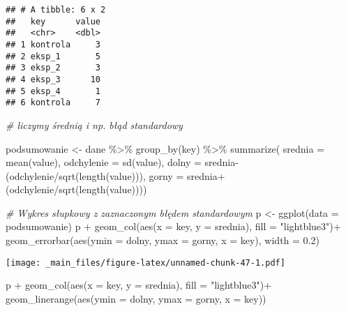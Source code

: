 \documentclass[
]{book}
\newenvironment{Shaded}{\begin{snugshade}}{\end{snugshade}}
\newcommand{\AttributeTok}[1]{\textcolor[rgb]{0.77,0.63,0.00}{#1}}
\newcommand{\CommentTok}[1]{\textcolor[rgb]{0.56,0.35,0.01}{\textit{#1}}}
\newcommand{\FloatTok}[1]{\textcolor[rgb]{0.00,0.00,0.81}{#1}}
\newcommand{\FunctionTok}[1]{\textcolor[rgb]{0.00,0.00,0.00}{#1}}
\newcommand{\NormalTok}[1]{#1}
\newcommand{\OtherTok}[1]{\textcolor[rgb]{0.56,0.35,0.01}{#1}}
\newcommand{\SpecialCharTok}[1]{\textcolor[rgb]{0.00,0.00,0.00}{#1}}
\newcommand{\StringTok}[1]{\textcolor[rgb]{0.31,0.60,0.02}{#1}}
\begin{document}
\begin{verbatim}
## # A tibble: 6 x 2
##   key      value
##   <chr>    <dbl>
## 1 kontrola     3
## 2 eksp_1       5
## 3 eksp_2       3
## 4 eksp_3      10
## 5 eksp_4       1
## 6 kontrola     7
\end{verbatim}

\begin{Shaded}
\begin{Highlighting}[]
\CommentTok{\# liczymy średnią i np. błąd standardowy}

\NormalTok{podsumowanie }\OtherTok{\textless{}{-}}\NormalTok{ dane }\SpecialCharTok{\%\textgreater{}\%} \FunctionTok{group\_by}\NormalTok{(key) }\SpecialCharTok{\%\textgreater{}\%}
  \FunctionTok{summarize}\NormalTok{(                      }\AttributeTok{srednia =} \FunctionTok{mean}\NormalTok{(value), }
                                  \AttributeTok{odchylenie =} \FunctionTok{sd}\NormalTok{(value), }
                                  \AttributeTok{dolny =}\NormalTok{ srednia}\SpecialCharTok{{-}}\NormalTok{(odchylenie}\SpecialCharTok{/}\FunctionTok{sqrt}\NormalTok{(}\FunctionTok{length}\NormalTok{(value))), }
                                  \AttributeTok{gorny =}\NormalTok{ srednia}\SpecialCharTok{+}\NormalTok{(odchylenie}\SpecialCharTok{/}\FunctionTok{sqrt}\NormalTok{(}\FunctionTok{length}\NormalTok{(value))))}

\CommentTok{\# Wykres słupkowy z zaznaczonym błędem standardowym}
\NormalTok{p }\OtherTok{\textless{}{-}} \FunctionTok{ggplot}\NormalTok{(}\AttributeTok{data =}\NormalTok{ podsumowanie)}
\NormalTok{p }\SpecialCharTok{+} \FunctionTok{geom\_col}\NormalTok{(}\FunctionTok{aes}\NormalTok{(}\AttributeTok{x =}\NormalTok{ key, }\AttributeTok{y =}\NormalTok{ srednia), }\AttributeTok{fill =} \StringTok{"lightblue3"}\NormalTok{)}\SpecialCharTok{+}
  \FunctionTok{geom\_errorbar}\NormalTok{(}\FunctionTok{aes}\NormalTok{(}\AttributeTok{ymin =}\NormalTok{ dolny, }\AttributeTok{ymax =}\NormalTok{ gorny, }\AttributeTok{x =}\NormalTok{ key), }\AttributeTok{width =} \FloatTok{0.2}\NormalTok{)}
\end{Highlighting}
\end{Shaded}

\texttt{[image: \_main\_files/figure-latex/unnamed-chunk-47-1.pdf]}

\begin{Shaded}
\begin{Highlighting}[]
\NormalTok{p }\SpecialCharTok{+} \FunctionTok{geom\_col}\NormalTok{(}\FunctionTok{aes}\NormalTok{(}\AttributeTok{x =}\NormalTok{ key, }\AttributeTok{y =}\NormalTok{ srednia), }\AttributeTok{fill =} \StringTok{"lightblue3"}\NormalTok{)}\SpecialCharTok{+}
  \FunctionTok{geom\_linerange}\NormalTok{(}\FunctionTok{aes}\NormalTok{(}\AttributeTok{ymin =}\NormalTok{ dolny, }\AttributeTok{ymax =}\NormalTok{ gorny, }\AttributeTok{x =}\NormalTok{ key))}
\end{Highlighting}
\end{Shaded}
\end{document}
